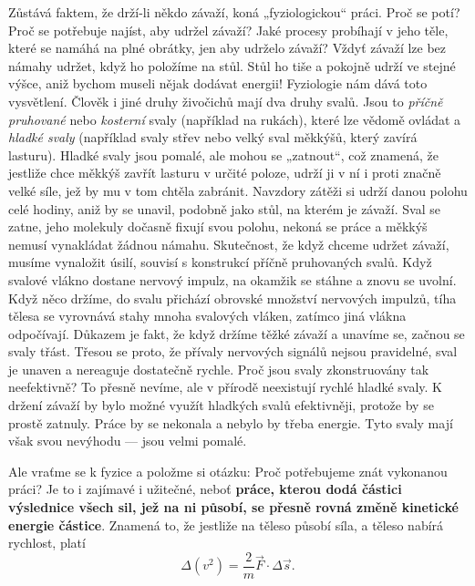 {    Zůstává faktem, že drží-li někdo závaží, koná „fyziologickou“ práci. Proč se potí? Proč se 
    potřebuje najíst, aby udržel závaží? Jaké procesy probíhají v jeho těle, které se namáhá na 
    plné obrátky, jen aby udrželo závaží? Vždyť závaží lze bez námahy udržet, když ho položíme na 
    stůl. Stůl ho tiše a pokojně udrží ve stejné výšce, aniž bychom museli nějak dodávat energii! 
    Fyziologie nám dává toto vysvětlení. Člověk i jiné druhy živočichů mají dva druhy svalů. Jsou 
    to \emph{příčně pruhované} nebo \emph{kosterní} svaly (například na rukách), které lze vědomě 
    ovládat a \emph{hladké svaly} (například svaly střev nebo velký sval měkkýšů, který zavírá 
    lasturu). Hladké svaly jsou pomalé, ale mohou se „zatnout“, což znamená, že jestliže chce 
    měkkýš zavřít lasturu v určité poloze, udrží ji v ní i proti značně velké síle, jež by mu v tom 
    chtěla zabránit. Navzdory zátěži si udrží danou polohu celé hodiny, aniž by se unavil, podobně 
    jako stůl, na kterém je závaží. Sval se zatne, jeho molekuly dočasně fixují svou polohu, nekoná 
    se práce a měkkýš nemusí vynakládat žádnou námahu. Skutečnost, že když chceme udržet závaží, 
    musíme vynaložit úsilí, souvisí s konstrukcí příčně pruhovaných svalů. Když svalové vlákno 
    dostane nervový impulz, na okamžik se stáhne a znovu se uvolní. Když něco držíme, do svalu 
    přichází obrovské množství nervových impulzů, tíha tělesa se vyrovnává stahy mnoha svalových 
    vláken, zatímco jiná vlákna odpočívají. Důkazem je fakt, že když držíme těžké závaží a unavíme 
    se, začnou se svaly třást. Třesou se proto, že přívaly nervových signálů nejsou pravidelné, 
    sval je unaven a nereaguje dostatečně rychle. Proč jsou svaly zkonstruovány tak neefektivně? To 
    přesně nevíme, ale v přírodě neexistují rychlé hladké svaly. K držení závaží by bylo možné 
    využít hladkých svalů efektivněji, protože by se prostě zatnuly. Práce by se nekonala a nebylo 
    by třeba energie. Tyto svaly mají však svou nevýhodu — jsou velmi pomalé.
    
    Ale vraťme se k fyzice a položme si otázku: Proč potřebujeme znát vykonanou práci? Je to i 
    zajímavé i užitečné, neboť \textbf{práce, kterou dodá částici výslednice všech sil, jež na ni 
    působí, se přesně rovná změně kinetické energie částice}. Znamená to, že jestliže na těleso 
    působí síla, a těleso nabírá rychlost, platí
    \begin{equation}\label{FYZ:eq018}
      \Delta(v^2) = \frac{2}{m}\vec{F}\cdot\Delta\vec{s}.
    \end{equation}
  
}
